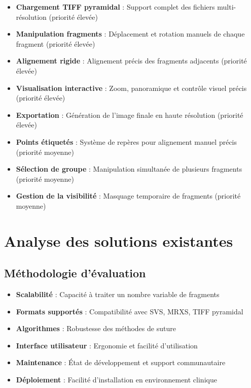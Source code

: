 \documentclass[11pt,a4paper]{report}
\begin{document}
\begin{itemize}
\item \textbf{Chargement TIFF pyramidal} : Support complet des fichiers multi-résolution (priorité élevée)
\item \textbf{Manipulation fragments} : Déplacement et rotation manuels de chaque fragment (priorité élevée)
\item \textbf{Alignement rigide} : Alignement précis des fragments adjacents (priorité élevée)
\item \textbf{Visualisation interactive} : Zoom, panoramique et contrôle visuel précis (priorité élevée)
\item \textbf{Exportation} : Génération de l'image finale en haute résolution (priorité élevée)
\item \textbf{Points étiquetés} : Système de repères pour alignement manuel précis (priorité moyenne)
\item \textbf{Sélection de groupe} : Manipulation simultanée de plusieurs fragments (priorité moyenne)
\item \textbf{Gestion de la visibilité} : Masquage temporaire de fragments (priorité moyenne)
\end{itemize}

\section{Analyse des solutions existantes}

\subsection{Méthodologie d'évaluation}

\begin{tcolorbox}[colback=TechBlue!10, colframe=TechBlue, title=Critères d'Évaluation]
\begin{itemize}[leftmargin=*]
    \item \textbf{Scalabilité} : Capacité à traiter un nombre variable de fragments
    \item \textbf{Formats supportés} : Compatibilité avec SVS, MRXS, TIFF pyramidal
    \item \textbf{Algorithmes} : Robustesse des méthodes de suture
    \item \textbf{Interface utilisateur} : Ergonomie et facilité d'utilisation
    \item \textbf{Maintenance} : État de développement et support communautaire
    \item \textbf{Déploiement} : Facilité d'installation en environnement clinique
\end{itemize}
\end{tcolorbox}
\end{document}
